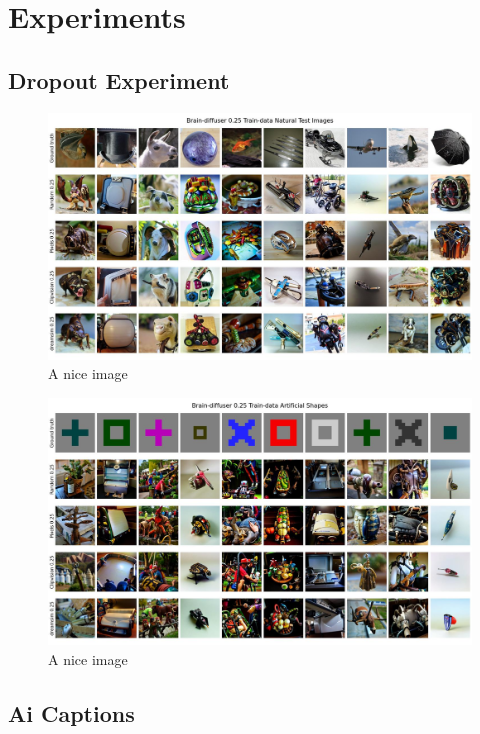 \chapter{Experiments}
\section{Dropout Experiment}


\begin{figure}[ht]
   \centering
   \includegraphics[width=1\textwidth]{plots/dropout_qual_eval_bd_test.JPEG}
   \caption{A nice image}\label{fig:dropout_qual_eval_bd_test}
\end{figure}

\begin{figure}[ht]
   \centering
   \includegraphics[width=1\textwidth]{plots/dropout_qual_eval_bd_art.JPEG}
   \caption{A nice image}\label{fig:dropout_qual_eval_bd_art}
\end{figure}

\section{Ai Captions}


